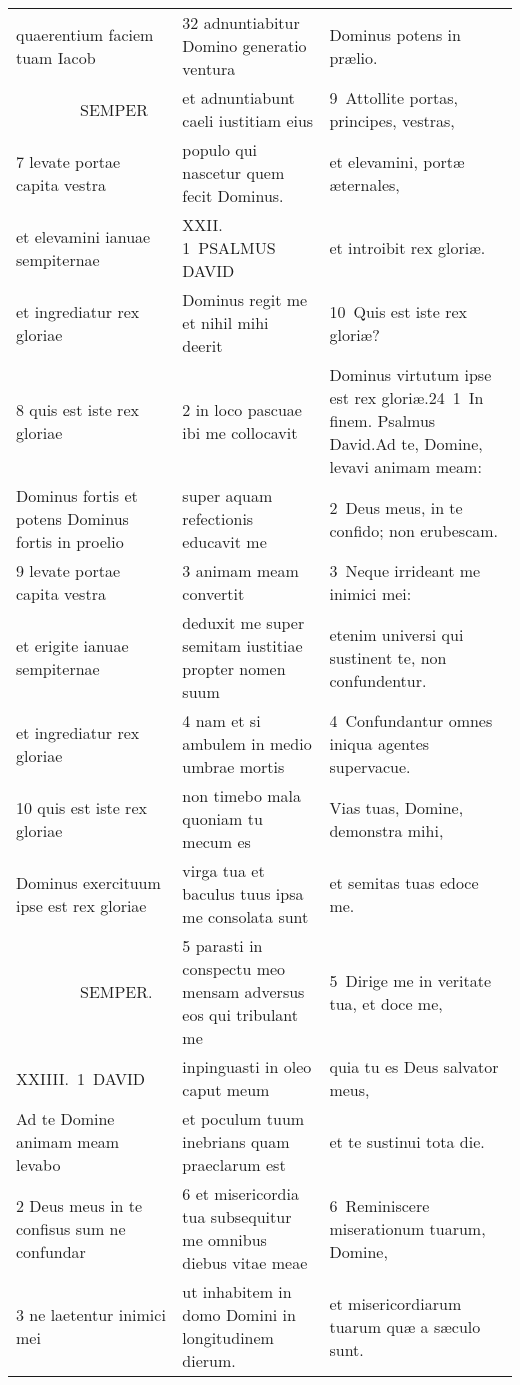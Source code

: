 \documentclass{article}
\begin{document}
\begin{longtable}{@{}p{}p{}p{}@{}}
quaerentium faciem tuam Iacob	&	32 adnuntiabitur Domino generatio ventura	&	Dominus potens in prælio.	\\
    SEMPER	&	et adnuntiabunt caeli iustitiam eius	&	9 Attollite portas, principes, vestras,	\\
7 levate portae capita vestra	&	populo qui nascetur quem fecit Dominus.	&	et elevamini, portæ æternales,	\\
et elevamini ianuae sempiternae	&	XXII. 1 PSALMUS DAVID	&	et introibit rex gloriæ.	\\
et ingrediatur rex gloriae	&	Dominus regit me et nihil mihi deerit	&	10 Quis est iste rex gloriæ?	\\
8 quis est iste rex gloriae	&	2 in loco pascuae ibi me collocavit	&	Dominus virtutum ipse est rex gloriæ.24 1 In finem. Psalmus David.Ad te, Domine, levavi animam meam:	\\
Dominus fortis et potens Dominus fortis in proelio	&	super aquam refectionis educavit me	&	2 Deus meus, in te confido; non erubescam.	\\
9 levate portae capita vestra	&	3 animam meam convertit	&	3 Neque irrideant me inimici mei:	\\
et erigite ianuae sempiternae	&	deduxit me super semitam iustitiae propter nomen suum	&	etenim universi qui sustinent te, non confundentur.	\\
et ingrediatur rex gloriae	&	4 nam et si ambulem in medio umbrae mortis	&	4 Confundantur omnes iniqua agentes supervacue.	\\
10 quis est iste rex gloriae	&	non timebo mala quoniam tu mecum es	&	Vias tuas, Domine, demonstra mihi,	\\
Dominus exercituum ipse est rex gloriae	&	virga tua et baculus tuus ipsa me consolata sunt	&	et semitas tuas edoce me.	\\
    SEMPER.	&	5 parasti in conspectu meo mensam adversus eos qui tribulant me	&	5 Dirige me in veritate tua, et doce me,	\\
XXIIII. 1 DAVID	&	inpinguasti in oleo caput meum	&	quia tu es Deus salvator meus,	\\
Ad te Domine animam meam levabo	&	et poculum tuum inebrians quam praeclarum est	&	et te sustinui tota die.	\\
2 Deus meus in te confisus sum ne confundar	&	6 et misericordia tua subsequitur me omnibus diebus vitae meae	&	6 Reminiscere miserationum tuarum, Domine,	\\
3 ne laetentur inimici mei	&	ut inhabitem in domo Domini in longitudinem dierum.	&	et misericordiarum tuarum quæ a sæculo sunt.	\\

\end{longtable}
\end{document}
